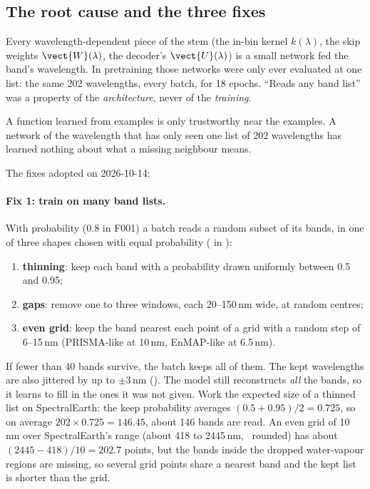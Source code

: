 \subsection{The root cause and the three fixes}

Every wavelength-dependent piece of the stem (the in-bin kernel $k(\lambda)$, the skip weights $\vect{W}(\lambda)$, the
decoder's $\vect{U}(\lambda)$) is a small network fed the band's wavelength. In pretraining those networks were only ever
evaluated at one list: the same 202 wavelengths, every batch, for 18 epochs. ``Reads any band list'' was a property of the
\emph{architecture}, never of the \emph{training}.
\begin{keypoint}
A function learned from examples is only trustworthy near the examples. A network of the wavelength that has only seen
one list of 202 wavelengths has learned nothing about what a missing neighbour means.
\end{keypoint}

The fixes adopted on 2026-10-14:

\paragraph{Fix 1: train on many band lists.} With probability 
(0.8 in F001) a batch reads a random subset of its bands, in one of three shapes chosen with equal probability
( in ):
\begin{enumerate}
  \item \textbf{thinning}: keep each band with a probability drawn uniformly between 0.5 and 0.95;
  \item \textbf{gaps}: remove one to three windows, each 20--150\,nm wide, at random centres;
  \item \textbf{even grid}: keep the band nearest each point of a grid with a random step of 6--15\,nm (PRISMA-like at
    10\,nm, EnMAP-like at 6.5\,nm).
\end{enumerate}
If fewer than 40 bands survive, the batch keeps all of them. The kept wavelengths are also jittered by up to
$\pm 3$\,nm (). The model still reconstructs \emph{all} the bands, so it learns to fill in the ones
it was not given. Work the expected size of a thinned list on SpectralEarth: the keep probability averages
$(0.5 + 0.95)/2 = 0.725$, so on average $202 \times 0.725 = 146.45$, about 146 bands are read. An even grid of 10\,nm over
SpectralEarth's range (about 418 to 2445\,nm, \tagA\ rounded) has about $(2445 - 418)/10 = 202.7$ points, but the bands
inside the dropped water-vapour regions are missing, so several grid points share a nearest band and the kept list is
shorter than the grid.

